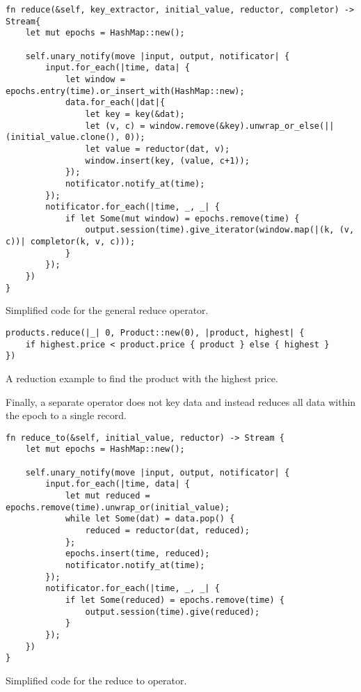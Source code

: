 \begin{listing}[H]
\begin{verbatim}
fn reduce(&self, key_extractor, initial_value, reductor, completor) -> Stream{
    let mut epochs = HashMap::new();

    self.unary_notify(move |input, output, notificator| {
        input.for_each(|time, data| {
            let window = epochs.entry(time).or_insert_with(HashMap::new);
            data.for_each(|dat|{
                let key = key(&dat);
                let (v, c) = window.remove(&key).unwrap_or_else(|| (initial_value.clone(), 0));
                let value = reductor(dat, v);
                window.insert(key, (value, c+1));
            });
            notificator.notify_at(time);
        });
        notificator.for_each(|time, _, _| {
            if let Some(mut window) = epochs.remove(time) {
                output.session(time).give_iterator(window.map(|(k, (v, c))| completor(k, v, c)));
            }
        });
    })
}
\end{verbatim}
  \caption{Simplified code for the general reduce operator.}
  \label{lst:reduce}
\end{listing}

\begin{listing}[H]
\begin{verbatim}
products.reduce(|_| 0, Product::new(0), |product, highest| {
    if highest.price < product.price { product } else { highest }
})
\end{verbatim}
\caption{A reduction example to find the product with the highest price.}
\label{lst:reduce-example}
\end{listing}

Finally, a separate  operator does not key data and instead reduces all data within the epoch to a single record.

\begin{listing}[H]
\begin{verbatim}
fn reduce_to(&self, initial_value, reductor) -> Stream {
    let mut epochs = HashMap::new();
    
    self.unary_notify(move |input, output, notificator| {
        input.for_each(|time, data| {
            let mut reduced = epochs.remove(time).unwrap_or(initial_value);
            while let Some(dat) = data.pop() {
                reduced = reductor(dat, reduced);
            };
            epochs.insert(time, reduced);
            notificator.notify_at(time);
        });
        notificator.for_each(|time, _, _| {
            if let Some(reduced) = epochs.remove(time) {
                output.session(time).give(reduced);
            }
        });
    })
}
\end{verbatim}
  \caption{Simplified code for the reduce to operator.}
  \label{lst:reduce-to}
\end{listing}

